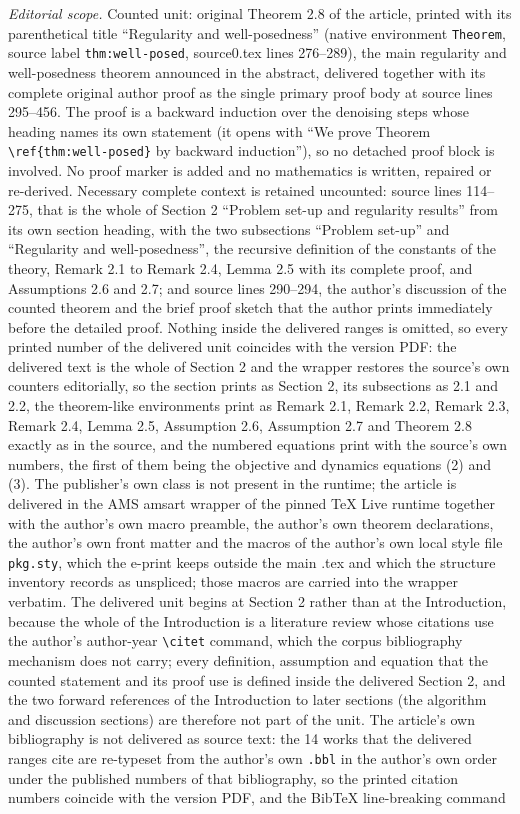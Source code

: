 \documentclass[10pt,a4paper]{amsart}
\begin{document}
\noindent\textit{Editorial scope.} Counted unit: original Theorem 2.8 of the article, printed with its parenthetical title ``Regularity and well-posedness'' (native environment \texttt{Theorem}, source label \texttt{thm:well-posed}, source0.tex lines 276--289), the main regularity and well-posedness theorem announced in the abstract, delivered together with its complete original author proof as the single primary proof body at source lines 295--456. The proof is a backward induction over the denoising steps whose heading names its own statement (it opens with ``We prove Theorem \texttt{\textbackslash ref\{thm:well-posed\}} by backward induction''), so no detached proof block is involved. No proof marker is added and no mathematics is written, repaired or re-derived. Necessary complete context is retained uncounted: source lines 114--275, that is the whole of Section 2 ``Problem set-up and regularity results'' from its own section heading, with the two subsections ``Problem set-up'' and ``Regularity and well-posedness'', the recursive definition of the constants of the theory, Remark 2.1 to Remark 2.4, Lemma 2.5 with its complete proof, and Assumptions 2.6 and 2.7; and source lines 290--294, the author's discussion of the counted theorem and the brief proof sketch that the author prints immediately before the detailed proof. Nothing inside the delivered ranges is omitted, so every printed number of the delivered unit coincides with the version PDF: the delivered text is the whole of Section 2 and the wrapper restores the source's own counters editorially, so the section prints as Section 2, its subsections as 2.1 and 2.2, the theorem-like environments print as Remark 2.1, Remark 2.2, Remark 2.3, Remark 2.4, Lemma 2.5, Assumption 2.6, Assumption 2.7 and Theorem 2.8 exactly as in the source, and the numbered equations print with the source's own numbers, the first of them being the objective and dynamics equations (2) and (3). The publisher's own class is not present in the runtime; the article is delivered in the AMS amsart wrapper of the pinned TeX Live runtime together with the author's own macro preamble, the author's own theorem declarations, the author's own front matter and the macros of the author's own local style file \texttt{pkg.sty}, which the e-print keeps outside the main .tex and which the structure inventory records as unspliced; those macros are carried into the wrapper verbatim. The delivered unit begins at Section 2 rather than at the Introduction, because the whole of the Introduction is a literature review whose citations use the author's author-year \texttt{\textbackslash citet} command, which the corpus bibliography mechanism does not carry; every definition, assumption and equation that the counted statement and its proof use is defined inside the delivered Section 2, and the two forward references of the Introduction to later sections (the algorithm and discussion sections) are therefore not part of the unit. The article's own bibliography is not delivered as source text: the 14 works that the delivered ranges cite are re-typeset from the author's own \texttt{.bbl} in the author's own order under the published numbers of that bibliography, so the printed citation numbers coincide with the version PDF, and the BibTeX line-breaking command 
\end{document}
